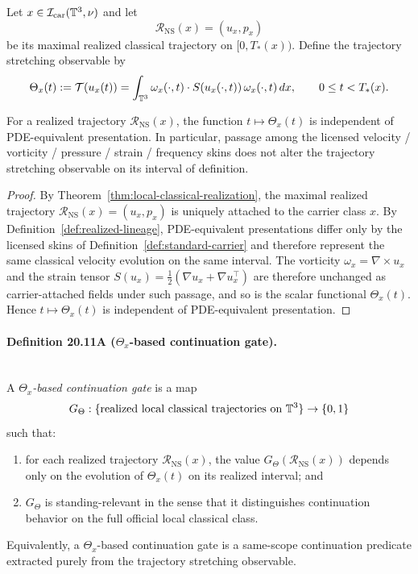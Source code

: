 \begin{definition}
\label{def:trajectory-stretching-observable}
Let $x\in\mathcal I_{\mathrm{car}}(\mathbb{T}^3,\nu)$ and let
\[
\mathcal R_{\mathrm{NS}}(x)=(u_x,p_x)
\]
be its maximal realized classical trajectory on $[0,T_*(x))$.
Define the trajectory stretching observable by
\[
\Theta_x(t):=\mathcal T(u_x(t))
=
\int_{\mathbb{T}^3}\omega_x(\cdot,t)\cdot S(u_x(\cdot,t))\,\omega_x(\cdot,t)\,dx,
\qquad 0\le t<T_*(x).
\]
\end{definition}

\begin{lemma}
\label{lem:trajectory-stretching-skin-invariant}
For a realized trajectory $\mathcal R_{\mathrm{NS}}(x)$, the function
$t\mapsto \Theta_x(t)$ is independent of PDE-equivalent presentation.
In particular, passage among the licensed velocity / vorticity / pressure / strain / frequency skins
does not alter the trajectory stretching observable on its interval of definition.
\end{lemma}

\begin{proof}
By Theorem~\ref{thm:local-classical-realization}, the maximal realized trajectory
$\mathcal R_{\mathrm{NS}}(x)=(u_x,p_x)$ is uniquely attached to the carrier class $x$. By
Definition~\ref{def:realized-lineage}, PDE-equivalent presentations differ only by the licensed skins
of Definition~\ref{def:standard-carrier} and therefore represent the same classical velocity
evolution on the same interval. The vorticity $\omega_x=\nabla\times u_x$ and the strain tensor
$S(u_x)=\tfrac12(\nabla u_x+\nabla u_x^\top)$ are therefore unchanged as carrier-attached fields under
such passage, and so is the scalar functional $\Theta_x(t)$. Hence $t\mapsto \Theta_x(t)$ is
independent of PDE-equivalent presentation.
\end{proof}

\paragraph{Definition 20.11A (\texorpdfstring{$\Theta_x$}{Theta_x}-based continuation gate).}\mbox{}\\
A \emph{$\Theta_x$-based continuation gate} is a map
\[
G_{\Theta}:\{\text{realized local classical trajectories on }\mathbb{T}^3\}\to\{0,1\}
\]
such that:
\begin{enumerate}[label=(\roman*), leftmargin=2.2em]
\item for each realized trajectory $\mathcal R_{\mathrm{NS}}(x)$, the value $G_{\Theta}(\mathcal R_{\mathrm{NS}}(x))$ depends only on the evolution of $\Theta_x(t)$ on its realized interval; and
\item $G_{\Theta}$ is standing-relevant in the sense that it distinguishes continuation behavior on the full official local classical class.
\end{enumerate}
Equivalently, a $\Theta_x$-based continuation gate is a same-scope continuation predicate extracted purely from the trajectory stretching observable.

